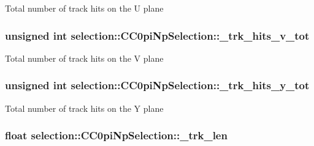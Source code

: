 Total number of track hits on the U plane \hypertarget{classselection_1_1CC0piNpSelection_a30fe5ccb6a299f7955125aa6c9d5923d}{
\subsubsection[{\-\_\-trk\-\_\-hits\-\_\-v\-\_\-tot}]{\setlength{\rightskip}{0pt plus 5cm}unsigned int selection\-::\-C\-C0pi\-Np\-Selection\-::\-\_\-trk\-\_\-hits\-\_\-v\-\_\-tot\hspace{0.3cm}{\ttfamily [private]}}}\label{classselection_1_1CC0piNpSelection_a30fe5ccb6a299f7955125aa6c9d5923d}
Total number of track hits on the V plane \hypertarget{classselection_1_1CC0piNpSelection_a76eb07fcb9190709464880c0ea7c4eba}{
\subsubsection[{\-\_\-trk\-\_\-hits\-\_\-y\-\_\-tot}]{\setlength{\rightskip}{0pt plus 5cm}unsigned int selection\-::\-C\-C0pi\-Np\-Selection\-::\-\_\-trk\-\_\-hits\-\_\-y\-\_\-tot\hspace{0.3cm}{\ttfamily [private]}}}\label{classselection_1_1CC0piNpSelection_a76eb07fcb9190709464880c0ea7c4eba}
Total number of track hits on the Y plane \hypertarget{classselection_1_1CC0piNpSelection_aab7945993678b44d7100abac6cc71655}{
\subsubsection[{\-\_\-trk\-\_\-len}]{\setlength{\rightskip}{0pt plus 5cm}float selection\-::\-C\-C0pi\-Np\-Selection\-::\-\_\-trk\-\_\-len\hspace{0.3cm}{\ttfamily [private]}}}\label{classselection_1_1CC0piNpSelection_aab7945993678b44d7100abac6cc71655}

